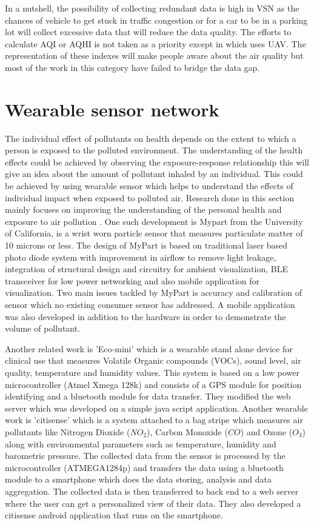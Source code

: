In a nutshell, the possibility of collecting redundant data is high in VSN as the chances of vehicle to get stuck in traffic congestion or for a car to be in a parking lot will collect excessive data that will reduce the data quality. The efforts to calculate AQI or AQHI is not taken as a priority except in \cite{Zhi2017} which uses UAV. The representation of  these indexes will make people aware about the air quality but most of the work in this category have failed to bridge the data gap.


\section{Wearable sensor network}


The individual effect of pollutants on health depends on the extent to which a person is exposed to the polluted environment. The understanding of the health effects could be achieved by observing the exposure-response relationship \cite{Dons2017} this will give an idea about the amount of pollutant inhaled by an individual. This could be achieved by using wearable sensor which helps to understand the effects of individual impact when exposed to polluted air. Research done in this section mainly focuses on improving the understanding of the personal health and exposure to air pollution \cite{Hu2015}. One such development is Mypart \cite{Tian2016}  from the University of California, is a wrist worn particle sensor that measures particulate matter of 10 microns or less.  The design of MyPart is based on traditional laser based photo diode system with improvement in airflow to remove light leakage, integration of structural design and circuitry for ambient visualization, BLE transceiver for low power networking and also mobile application for visualization. Two main issues tackled by MyPart is accuracy and calibration of sensor which no existing consumer sensor has addressed. A mobile application was also developed in addition to the hardware in order to demonstrate the volume of pollutant.

Another related work is 'Eco-mini'\cite{Fletcher2015} which is a wearable stand alone device for clinical use that measures Volatile Organic compounds (VOCs), sound level, air quality, temperature and humidity values. This system is based on a low power microcontroller (Atmel Xmega 128k) and consists of a GPS module for position identifying and a bluetooth module for data transfer. They modified the web server which was developed on a simple java script application. Another wearable work is 'citisense' \cite{Zappi2012} which is a system attached to a bag stripe which measures air pollutants like Nitrogen Dioxide ($NO_2$), Carbon Monoxide ($CO$) and Ozone  ($O_3$) along with environmental parameters such as temperature, humidity and barometric pressure. The collected data from the sensor is processed by the microcontroller (ATMEGA1284p) and transfers the data using a bluetooth module to a smartphone which does the data storing, analysis and data aggregation. The collected data is then transferred to back end to a web server where the user can get a personalized view of their data. They also developed a citisense android application that runs on the smartphone.
 
